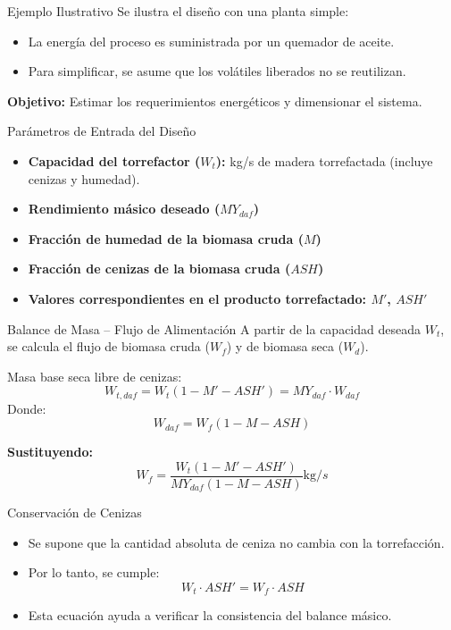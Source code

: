 \documentclass[main.tex]{subfiles}
\begin{document}
\begin{frame}{Ejemplo Ilustrativo}
  Se ilustra el diseño con una planta simple:

  \begin{itemize}
    \item La energía del proceso es suministrada por un quemador de aceite.
    \item Para simplificar, se asume que los volátiles liberados no se reutilizan.
  \end{itemize}

  \textbf{Objetivo:} Estimar los requerimientos energéticos y dimensionar el sistema.
\end{frame}




\begin{frame}{Parámetros de Entrada del Diseño}
  \begin{itemize}
    \item \textbf{Capacidad del torrefactor ($W_t$):} kg/s de madera torrefactada (incluye cenizas y humedad).
    \item \textbf{Rendimiento másico deseado ($MY_{daf}$)}
    \item \textbf{Fracción de humedad de la biomasa cruda ($M$)}
    \item \textbf{Fracción de cenizas de la biomasa cruda ($ASH$)}
    \item \textbf{Valores correspondientes en el producto torrefactado: $M'$, $ASH'$}
  \end{itemize}
\end{frame}

\begin{frame}{Balance de Masa – Flujo de Alimentación}
  \small
  A partir de la capacidad deseada $W_t$, se calcula el flujo de biomasa cruda ($W_f$) y de biomasa seca ($W_d$).

  \vspace{0.3cm}
  Masa base seca libre de cenizas:
  \[
    W_{t,daf} = W_t (1 - M' - ASH') = MY_{daf} \cdot W_{daf}
  \]
  Donde:
  \[
    W_{daf} = W_f (1 - M - ASH)
  \]

  \textbf{Sustituyendo:}
  \[
    W_f = \frac{W_t (1 - M' - ASH')}{MY_{daf}(1 - M - ASH)} \si{\kilogram /s}
  \]
\end{frame}



\begin{frame}{Conservación de Cenizas}
  \begin{itemize}
    \item Se supone que la cantidad absoluta de ceniza no cambia con la torrefacción.
    \item Por lo tanto, se cumple:
    \[
      W_t \cdot ASH' = W_f \cdot ASH
    \]
    \item Esta ecuación ayuda a verificar la consistencia del balance másico.
  \end{itemize}
\end{frame}
\end{document}

